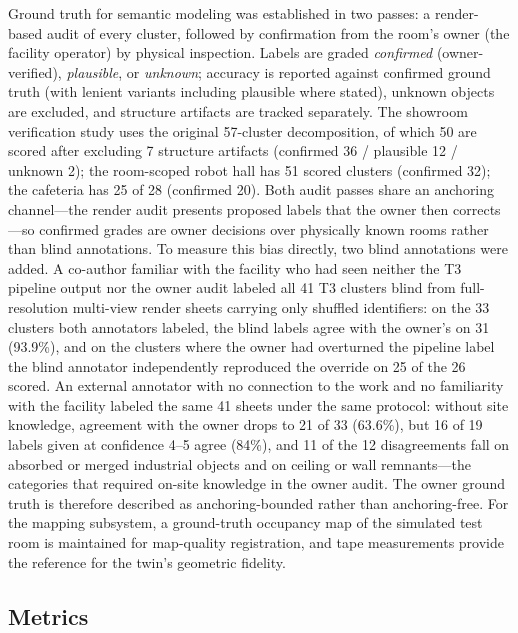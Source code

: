 Ground truth for semantic modeling was established in two passes: a
render-based audit of every cluster, followed by confirmation from the room's
owner (the facility operator) by physical inspection. Labels are graded
\emph{confirmed} (owner-verified), \emph{plausible}, or \emph{unknown};
accuracy is reported against confirmed ground truth (with lenient variants
including plausible where stated), unknown objects are excluded, and structure
artifacts are tracked separately. The showroom verification study uses the
original 57-cluster decomposition, of which 50 are scored after excluding 7
structure artifacts (confirmed 36 / plausible 12 / unknown 2); the room-scoped
robot hall has 51 scored clusters (confirmed 32); the cafeteria has 25 of 28
(confirmed 20). Both audit passes share an anchoring channel---the render
audit presents proposed labels that the owner then corrects---so confirmed
grades are owner decisions over physically known rooms rather than blind
annotations. To measure this bias directly, two blind annotations were added.
A co-author familiar with the facility who had seen neither the T3 pipeline
output nor the owner audit labeled all 41 T3 clusters blind from
full-resolution multi-view render sheets carrying only shuffled identifiers:
on the 33 clusters both annotators labeled, the blind labels agree with the
owner's on 31 (93.9\%), and on the clusters where the owner had overturned the
pipeline label the blind annotator independently reproduced the override on 25
of the 26 scored. An external annotator with no connection to the work and
no familiarity with the facility labeled the same 41 sheets under the same
protocol: without site knowledge, agreement with the owner drops to 21 of 33
(63.6\%), but 16 of 19 labels given at confidence 4--5 agree (84\%), and 11 of
the 12 disagreements fall on absorbed or merged industrial objects and on
ceiling or wall remnants---the categories that required on-site knowledge in
the owner audit. The owner ground truth is therefore described as
anchoring-bounded rather than anchoring-free. For the mapping subsystem, a
ground-truth occupancy map of the simulated test room is maintained for
map-quality registration, and tape measurements provide the reference for the
twin's geometric fidelity.

\subsection{Metrics}
\label{subsec:metrics}


